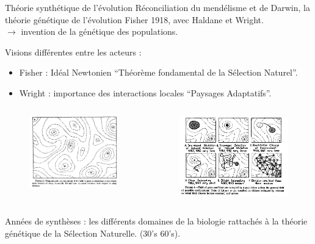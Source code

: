 \documentclass[8pt]{beamer}
\begin{document}
\begin{frame}{Théorie synthétique de l'évolution}
	Réconciliation du mendélisme et de Darwin, la théorie génétique de l'évolution Fisher 1918, avec Haldane et Wright.\\

	$\rightarrow$ invention de la génétique des populations.
	\vfill 

	Visions différentes entre les acteurs :
	\begin{itemize}
		\item Fisher : Idéal Newtonien ``Théorème fondamental de la Sélection Naturel''.
		\item Wright : importance des interactions locales ``Paysages Adaptatifs''.
	\end{itemize}

	\begin{columns}
		\begin{figure}[hbp]
			\begin{center}
				\includegraphics[width=4cm]{images/wrightFL.png}
			\end{center}
		\end{figure}
		\begin{figure}[hbp]
			\begin{center}
				\includegraphics[width=5cm]{images/wrightFL2.png}
			\end{center}
		\end{figure}
	\end{columns}

	\vfill
	Années de synthèses : les différents domaines de la biologie rattachés à la théorie génétique de la Sélection Naturelle. (30's 60's).

\end{frame}
\end{document}
